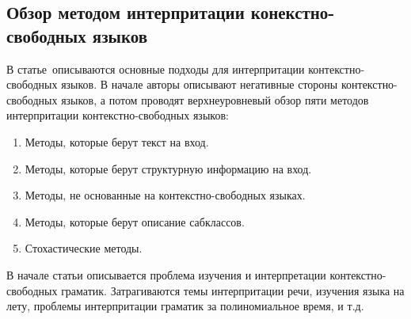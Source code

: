 \subsection{Обзор методом интерпритации конекстно-свободных языков} \label{subsection_Lee1996}
В статье\,\cite{Lee1996} описываются основные подходы для интерпритации контекстно-свободных языков. В начале авторы описывают негативные стороны контекстно-свободных языков, а потом проводят верхнеуровневый обзор пяти методов интерпритации контекстно-свободных языков: 
\begin{enumerate} 
	\item{Методы, которые берут текст на вход.}
	\item{Методы, которые берут структурную информацию на вход.}
	\item{Методы, не основанные на контекстно-свободных языках.}
	\item{Методы, которые берут описание сабклассов.}
	\item{Стохастические методы.}
\end{enumerate}

В начале статьи описывается проблема изучения и интерпретации контекстно-свободных граматик. Затрагиваются темы интерпритации речи, изучения языка на лету, проблемы интерпритации граматик за полиномиальное время, и т.д.

